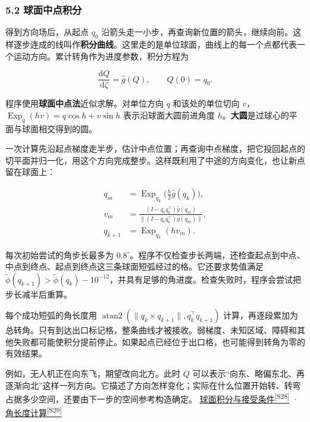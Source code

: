 \documentclass[11pt,a4paper]{article}
\numberwithin{equation}{topic}
\newcommand{\sourceref}[2]{\hyperlink{source-#1}{#2\textsuperscript{[#1]}}}
\begin{document}
\subsubsection*{5.2 球面中点积分}

得到方向场后，从起点 \(q_0\) 沿箭头走一小步，再查询新位置的箭头，继续向前。这样逐步连成的线叫作\textbf{积分曲线}。这里走的是单位球面，曲线上的每一个点都代表一个运动方向。累计转角作为进度参数，积分方程为

\begin{equation}
\label{eq:ode}
\frac{\mathrm dQ}{\mathrm d\zeta}=\hat g(Q),
\qquad Q(0)=q_0.
\end{equation}

程序使用\textbf{球面中点法}近似求解。对单位方向 \(q\) 和该处的单位切向 \(v\)，\(\operatorname{Exp}_q(hv)=q\cos h+v\sin h\) 表示沿球面大圆前进角度 \(h\)。\textbf{大圆}是过球心的平面与球面相交得到的圆。

一次计算先沿起点梯度走半步，估计中点位置；再查询中点梯度，把它投回起点的切平面并归一化，用这个方向完成整步。这样既利用了中途的方向变化，也让新点留在球面上：

\begin{equation}
\label{eq:midpoint}
\begin{aligned}
q_m&=\operatorname{Exp}_{q_k}\bigl(\tfrac h2\hat g(q_k)\bigr),\\
v_m&=\frac{(I-q_kq_k^\top)\hat g(q_m)}
           {\|(I-q_kq_k^\top)\hat g(q_m)\|},\\
q_{k+1}&=\operatorname{Exp}_{q_k}(h v_m).
\end{aligned}
\end{equation}

每次初始尝试的角步长最多为 \(0.8^\circ\)。程序不仅检查步长两端，还检查起点到中点、中点到终点、起点到终点这三条球面短弧经过的格。它还要求势值满足 \(\tilde\phi(q_{k+1})>\tilde\phi(q_k)-10^{-12}\)，并具有足够的角进度。检查失败时，程序会尝试把步长减半后重算。

每个成功短弧的角长度用 \(\operatorname{atan2}(\|q_k\times q_{k+1}\|,q_k^\top q_{k+1})\) 计算，再逐段累加为总转角。只有到达出口标记格，整条曲线才被接收。弱梯度、未知区域、障碍和其他失败都可能使积分提前停止。如果起点已经位于出口格，也可能得到转角为零的有效结果。

例如，无人机正在向东飞，期望改向北方。此时 \(Q\) 可以表示“向东、略偏东北、再逐渐向北”这样一列方向。它描述了方向怎样变化；实际在什么位置开始转、转弯占据多少空间，还要由下一步的空间参考构造确定。 \sourceref{S28}{球面积分与接受条件} · \sourceref{S29}{角长度计算}
\end{document}
